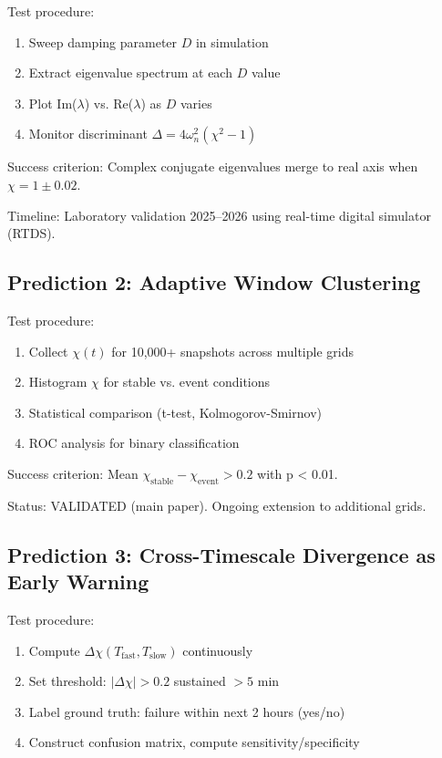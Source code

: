 \documentclass[11pt,letterpaper]{article}
\newcommand{\symchi}{\chi}
\begin{document}
Test procedure:
\begin{enumerate}
\item Sweep damping parameter $D$ in simulation
\item Extract eigenvalue spectrum at each $D$ value
\item Plot Im($\lambda$) vs. Re($\lambda$) as $D$ varies
\item Monitor discriminant $\Delta = 4\omega_n^2(\symchi^2 - 1)$
\end{enumerate}

Success criterion: Complex conjugate eigenvalues merge to real axis when $\symchi = 1 \pm 0.02$.

Timeline: Laboratory validation 2025--2026 using real-time digital simulator (RTDS).

\subsection{Prediction 2: Adaptive Window Clustering}

Test procedure:
\begin{enumerate}
\item Collect $\symchi(t)$ for 10,000+ snapshots across multiple grids
\item Histogram $\symchi$ for stable vs. event conditions
\item Statistical comparison (t-test, Kolmogorov-Smirnov)
\item ROC analysis for binary classification
\end{enumerate}

Success criterion: Mean $\symchi_{\text{stable}} - \symchi_{\text{event}} > 0.2$ with p < 0.01.

Status: VALIDATED (main paper). Ongoing extension to additional grids.

\subsection{Prediction 3: Cross-Timescale Divergence as Early Warning}

Test procedure:
\begin{enumerate}
\item Compute $\Delta\symchi(T_{\text{fast}}, T_{\text{slow}})$ continuously
\item Set threshold: $|\Delta\symchi| > 0.2$ sustained $> 5$ min
\item Label ground truth: failure within next 2 hours (yes/no)
\item Construct confusion matrix, compute sensitivity/specificity
\end{enumerate}
\end{document}
